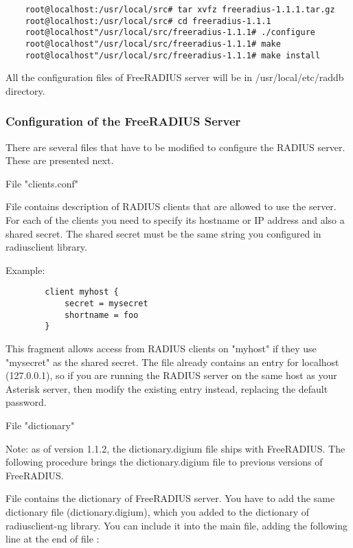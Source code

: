 \begin{verbatim}
	root@localhost:/usr/local/src# tar xvfz freeradius-1.1.1.tar.gz
	root@localhost:/usr/local/src# cd freeradius-1.1.1
	root@localhost"/usr/local/src/freeradius-1.1.1# ./configure
	root@localhost"/usr/local/src/freeradius-1.1.1# make
	root@localhost"/usr/local/src/freeradius-1.1.1# make install
\end{verbatim}

	All the configuration files of FreeRADIUS server will be in
	/usr/local/etc/raddb directory.
		

\subsubsection{Configuration of the FreeRADIUS Server}
			
	There are several files that have to be modified to configure the
	RADIUS server. These are presented next.

	File "clients.conf"
			
	File  contains description of
	RADIUS clients that are allowed to use the server. For each of the
	clients you need to specify its hostname or IP address and also a
	shared secret. The shared secret must be the same string you configured
	in radiusclient library.

	Example:
\begin{verbatim}
		client myhost {
		    secret = mysecret
		    shortname = foo
		}
\end{verbatim}	

	This fragment allows access from RADIUS clients on "myhost" if they use
	"mysecret" as the shared secret.	
	The file already contains an entry for localhost (127.0.0.1), so if you
	are running the RADIUS server on the same host as your Asterisk server,
	then modify the existing entry instead, replacing the default password.
		
	File "dictionary"
		
	Note: as of version 1.1.2, the dictionary.digium file ships with FreeRADIUS.
	The following procedure brings the dictionary.digium file to previous versions
	of FreeRADIUS.
	
	File  contains the dictionary of
	FreeRADIUS server. You have to add the same dictionary file
	(dictionary.digium), which you added to the dictionary of radiusclient-ng
	library. You can include it into the main file, adding the following line at the
	end of file :
		
